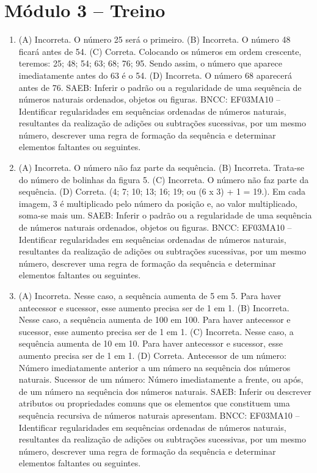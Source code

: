 \section*{Módulo 3 -- Treino}

\begin{enumerate}
\item
(A) Incorreta. O número 25 será o primeiro.
(B) Incorreta. O número 48 ficará antes de 54.
(C) Correta. Colocando os números em ordem crescente, teremos: 25; 48; 54; 63; 68; 76; 95. Sendo assim, o número que aparece imediatamente antes do 63 é o 54.
(D) Incorreta. O número 68 aparecerá antes de 76.
SAEB: Inferir o padrão ou a regularidade de uma sequência de números naturais ordenados, objetos ou figuras.
BNCC: EF03MA10 -- Identificar regularidades em sequências ordenadas de números naturais,
resultantes da realização de adições ou subtrações sucessivas, por um mesmo número,
descrever uma regra de formação da sequência e determinar elementos faltantes ou seguintes.

\item
(A) Incorreta. O número não faz parte da sequência.
(B) Incorreta. Trata-se do número de bolinhas da figura 5.
(C) Incorreta. O número não faz parte da sequência.
(D) Correta. (4; 7; 10; 13; 16; 19; ou (6 x 3) + 1 = 19.). Em cada imagem, 3 é multiplicado pelo número da posição e, ao valor multiplicado, soma-se mais um.
SAEB: Inferir o padrão ou a regularidade de uma sequência de números naturais ordenados, objetos ou figuras.
BNCC: EF03MA10 -- Identificar regularidades em sequências ordenadas de números naturais,
resultantes da realização de adições ou subtrações sucessivas, por um mesmo número,
descrever uma regra de formação da sequência e determinar elementos faltantes ou seguintes.

\item
(A) Incorreta. Nesse caso, a sequência aumenta de 5 em 5. Para haver antecessor e sucessor, esse aumento precisa ser de 1 em 1.
(B) Incorreta. Nesse caso, a sequência aumenta de 100 em 100. Para haver antecessor e sucessor, esse aumento precisa ser de 1 em 1.
(C) Incorreta. Nesse caso, a sequência aumenta de 10 em 10. Para haver antecessor e sucessor, esse aumento precisa ser de 1 em 1.
(D) Correta. Antecessor de um número: Número imediatamente anterior a um número na sequência dos números naturais. Sucessor de um número: Número imediatamente a frente, ou após, de um número na sequência dos números naturais.
SAEB: Inferir ou descrever atributos ou propriedades comuns que os elementos que constituem uma sequência recursiva de números naturais apresentam.
BNCC: EF03MA10 -- Identificar regularidades em sequências ordenadas de números naturais,
resultantes da realização de adições ou subtrações sucessivas, por um mesmo número,
descrever uma regra de formação da sequência e determinar elementos faltantes ou seguintes.
\end{enumerate}



